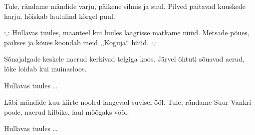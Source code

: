 Tule, r\"andame m\"andide varju,
p\"aikene silmis ja suul.
Pilved paitavad kuuskede harju,
h\~oiskab laululind k\~orgel puul.

:,: Hullavas tuules,
maanteel kui luules
laagrisse matkame n\"u\"ud.
Metsade p\~oues,
p\"aikses ja k\~oues
koondab meid {,,}Koguja{``} h\"u\"ud. :,: 

S\~onajalgade keskele naerud
kerkivad telgiga koos.
J\"arvel \~ohtuti s\~ouavad aerud,
l\~oke loidab kui muinasloos.

Hullavas tuules \ldots

L\"abi m\"andide kuu-kiirte nooled
langevad suvisel \"o\"ol.
Tule, r\"andame Suur-Vankri poole,
naerud kilbiks, laul m\~o\~ogaks v\"o\"ol.

Hullavas tuules \ldots